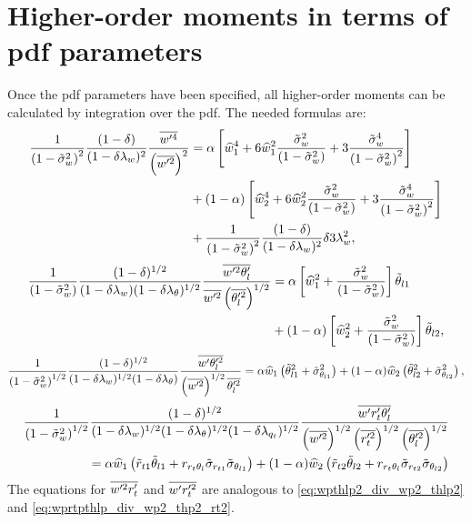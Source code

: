 \section{Higher-order moments in terms of pdf parameters}\label{sec:higher_order_moments}

Once the \gls{pdf} parameters have been specified,
all higher-order moments can be calculated by integration over the \gls{pdf}.
The needed formulas are:
\begin{align}
    \label{eq:wp4_div_wp2_2}
    \frac{1}{\left( 1 - \tilde{\sigma}_w^2 \right)^2} \frac{(1-\delta)}{(1-\delta \lambda_w)^2} \frac{\overline{w'^4}}{\left(\overline{w'^2} \right)^2}
    &= \alpha \left[\widehat{w}_1^4 +
    6 \widehat{w}_1^2 \frac{{\tilde{\sigma}_w}^2}{\left( 1 - \tilde{\sigma}_w^2 \right)} +
    3 \frac{{\tilde{\sigma}_w}^4}{\left( 1 - \tilde{\sigma}_w^2 \right)^2} \right] \nonumber \\
    &+ (1 - \alpha) \left[\widehat{w}_2^4 +
    6 \widehat{w}_2^2 \frac{{\tilde{\sigma}_w}^2}{\left( 1 - \tilde{\sigma}_w^2 \right)} +
    3 \frac{{\tilde{\sigma}_w}^4}{\left( 1 - \tilde{\sigma}_w^2 \right)^2} \right] \nonumber \\
    &+ \frac{1}{\left( 1 - \tilde{\sigma}_w^2 \right)^2} \frac{(1-\delta)}{(1-\delta \lambda_w)^2} \delta 3 \lambda_w^2,
\end{align}
\begin{align}
    \label{eq:wp2thlp_div_wp2thl2}
    \frac{1}{\left( 1 - \tilde{\sigma}_w^2 \right)} \frac{(1-\delta)^{1/2}}{(1-\delta \lambda_w) (1-\delta \lambda_\theta)^{1/2}}
    \frac{\overline{w'^2 \theta_l'}}{\overline{w'^2} \left(\overline{\theta_l'^2} \right)^{1/2}}
    &= \alpha \left[\widehat{w}_1^2 + \frac{{\tilde{\sigma}_w}^2}{\left( 1 - \tilde{\sigma}_w^2 \right)} \right] \tilde{\theta}_{l1} \nonumber\\
    &+ (1-\alpha) \left[\widehat{w}_2^2 + \frac{{\tilde{\sigma}_w}^2}{\left( 1 - \tilde{\sigma}_w^2 \right)}\right] \tilde{\theta}_{l2},
\end{align}
\begin{align}
    \label{eq:wpthlp2_div_wp2_thlp2}
    \frac{1}{\left( 1 - \tilde{\sigma}_w^2 \right)^{1/2}} \frac{(1-\delta)^{1/2}}{(1-\delta \lambda_w)^{1/2} (1-\delta \lambda_\theta)}
    \frac{\overline{w' \theta_l'^2}}{\left(\overline{w'^2}\right)^{1/2}\overline{\theta_l'^2}}
    = \alpha  \widehat{w}_1  \left( \tilde{\theta}_{l1}^2 + \tilde{\sigma}_{\theta_{l1}}^2 \right)
    + (1-\alpha) \widehat{w}_2 \left( \tilde{\theta}_{l2}^2 + \tilde{\sigma}_{\theta_{l2}}^2 \right),
\end{align}
\begin{align}
    \label{eq:wprtpthlp_div_wp2_thp2_rt2}
    \frac{1}{\left( 1 - \tilde{\sigma}_w^2 \right)^{1/2}}
    \frac{(1-\delta)^{1/2}}
    {(1-\delta \lambda_w)^{1/2} (1-\delta \lambda_\theta)^{1/2}(1-\delta \lambda_{q_t})^{1/2}}
    \frac{\overline{w' r_t' \theta_l'}}
    {\left( \overline{w'^2} \right)^{1/2}\left(\overline{r_t'^2} \right)^{1/2} \left( \overline{\theta_l'^2} \right)^{1/2}} \nonumber \\
    = \alpha \widehat{w}_1 \left(\tilde{r}_{t1} \tilde{\theta}_{l1} +
    r_{r_t \theta_l} \tilde{\sigma}_{r_{t1}} \tilde{\sigma}_{\theta_{l1}} \right) +
    (1-\alpha) \widehat{w}_2 \left(\tilde{r}_{t2} \tilde{\theta}_{l2} +
    r_{r_t \theta_l} \tilde{\sigma}_{r_{t2}} \tilde{\sigma}_{\theta_{l2}} \right)
\end{align}
The equations for $\overline{w'^2 r_t'}$ and $\overline{w' r_t'^2}$ are analogous to \cref{eq:wpthlp2_div_wp2_thlp2}
and \cref{eq:wprtpthlp_div_wp2_thp2_rt2}.